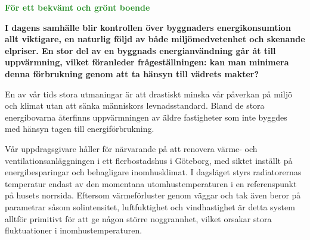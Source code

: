 \documentclass[11pt,a4paper]{article}
\begin{document}
\pagestyle{fancy}
\rhead{\sc\footnotesize \today}
\mbox{}

\begin{center}
\textcolor{ForestGreen}{\textbf{\Large För ett bekvämt och grönt boende}}
\end{center}

\mbox{}
\vspace{-5mm}

\setlength{\columnsep}{5mm}
\begin{multicols}{2}
\normalsize

\begin{comment}
Vårt kandidatarbete, ''Stabilisera temperaturen i en fastighet med avseende på väderförändringar'', genomförs vid institutionen för Teknisk Fysik. Arbetsgruppen består av Mats Lindström, Dan Ståby, Ylva Dahl och Erik Ahlqvist och i vår mening passar projektet utmärkt under kategorin ''Green Initiative \& Sustainable Development''.
\end{comment}

\textbf{I dagens samhälle blir kontrollen över byggnaders energikonsumtion allt viktigare, en naturlig följd av både miljömedvetenhet och skenande elpriser. En stor del av en byggnads energianvändning går åt till uppvärmning, vilket föranleder frågeställningen: kan man minimera denna förbrukning genom att ta hänsyn till vädrets makter?}

En av vår tids stora utmaningar är att drastiskt minska vår påverkan på miljö och klimat utan att sänka människors levnadsstandard. Bland de stora energibovarna återfinns uppvärmningen av äldre fastigheter som inte byggdes med hänsyn tagen till energiförbrukning.

Vår uppdragsgivare håller för närvarande på att renovera värme- och ventilationsanläggningen i ett flerbostadshus i Göteborg, med siktet inställt på energibesparingar och behagligare inomhusklimat. I dagsläget styrs radiatorernas  temperatur endast av den momentana utomhustemperaturen i en referenspunkt på husets norrsida. Eftersom värmeförluster genom väggar och tak även beror på parametrar såsom solintensitet, luftfuktighet och vindhastighet är detta system alltför primitivt för att ge någon större noggrannhet, vilket orsakar stora fluktuationer i inomhustemperaturen. 


\end{multicols}
\end{document}
